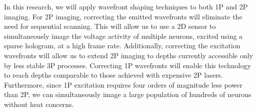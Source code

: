 In this research, we will apply wavefront shaping techniques to both 1P and 2P imaging. For 2P imaging, correcting the emitted wavefronts will eliminate the need for sequential scanning. This will allow us to use a 2D sensor to simultaneously image the voltage activity of multiple neurons, excited using a sparse hologram, at a high frame rate. Additionally, correcting the excitation wavefronts will allow us to extend 2P imaging to depths currently accessible only by less stable 3P processes. Correcting 1P wavefronts will enable this technology to reach depths comparable to those achieved with expensive 2P lasers. %
 Furthermore, since 1P excitation requires four orders of magnitude less power than 2P, we can simultaneously image a large population of hundreds of neurons without heat concerns.

